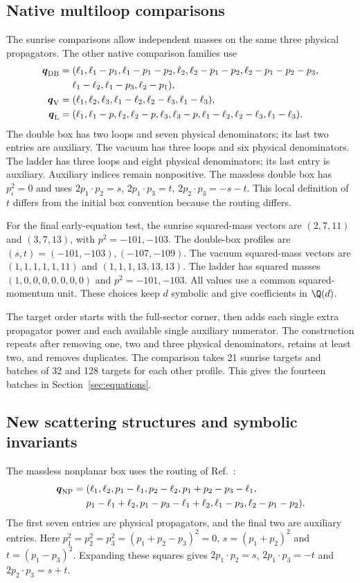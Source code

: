 \subsection{Native multiloop comparisons}
The sunrise comparisons allow independent masses on the same three physical propagators. The other native comparison families use
\begin{align}
 \boldsymbol q_{\rm DB}={}&(\ell_1,\ell_1-p_1,\ell_1-p_1-p_2,
 \ell_2,\ell_2-p_1-p_2,\ell_2-p_1-p_2-p_3,\nonumber\\
 &\ell_1-\ell_2,\ell_1-p_3,\ell_2-p_1),\\
 \boldsymbol q_{\rm V}={}&(\ell_1,\ell_2,\ell_3,\ell_1-\ell_2,
 \ell_2-\ell_3,\ell_1-\ell_3),\\
 \boldsymbol q_{\rm L}={}&(\ell_1,\ell_1-p,\ell_2,\ell_2-p,\ell_3,
 \ell_3-p,\ell_1-\ell_2,\ell_2-\ell_3,\ell_1-\ell_3).
\end{align}
The double box has two loops and seven physical denominators; its last two entries are auxiliary. The vacuum has three loops and six physical denominators. The ladder has three loops and eight physical denominators; its last entry is auxiliary. Auxiliary indices remain nonpositive. The massless double box has $p_i^2=0$ and uses $2p_1\cdot p_2=s$, $2p_1\cdot p_3=t$, $2p_2\cdot p_3=-s-t$. This local definition of $t$ differs from the initial box convention because the routing differs.

For the final early-equation test, the sunrise squared-mass vectors are $(2,7,11)$ and $(3,7,13)$, with $p^2=-101,-103$. The double-box profiles are $(s,t)=(-101,-103),(-107,-109)$. The vacuum squared-mass vectors are $(1,1,1,1,1,11)$ and $(1,1,1,13,13,13)$. The ladder has squared masses $(1,0,0,0,0,0,0,0)$ and $p^2=-101,-103$. All values use a common squared-momentum unit. These choices keep $d$ symbolic and give coefficients in $\Q(d)$.

The target order starts with the full-sector corner, then adds each single extra propagator power and each available single auxiliary numerator. The construction repeats after removing one, two and three physical denominators, retains at least two, and removes duplicates. The comparison takes 21 sunrise targets and batches of 32 and 128 targets for each other profile. This gives the fourteen batches in Section~\ref{sec:equations}.

\subsection{New scattering structures and symbolic invariants}
The massless nonplanar box uses the routing of Ref.~\cite{KiraOriginal}:
\begin{align}
 \boldsymbol q_{\rm NP}={}&(\ell_1,\ell_2,p_1-\ell_1,p_2-\ell_2,
 p_1+p_2-p_3-\ell_1,\nonumber\\
 &p_1-\ell_1+\ell_2,p_1-p_3-\ell_1+\ell_2,
 \ell_1-p_3,\ell_2-p_1-p_2).
\end{align}
The first seven entries are physical propagators, and the final two are auxiliary entries. Here $p_1^2=p_2^2=p_3^2=(p_1+p_2-p_3)^2=0$, $s=(p_1+p_2)^2$ and $t=(p_1-p_3)^2$. Expanding these squares gives $2p_1\cdot p_2=s$, $2p_1\cdot p_3=-t$ and $2p_2\cdot p_3=s+t$.

